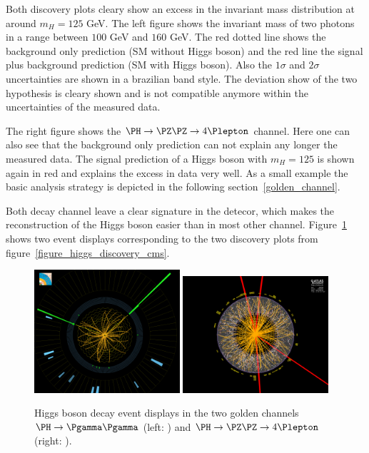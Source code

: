 Both discovery plots cleary show an excess in the invariant mass distribution at around $m_H=125$ GeV. The left figure
shows the invariant mass of two photons in a range between $100$ GeV and $160$ GeV. The red dotted line shows the background only
prediction (SM without Higgs boson) and the red line the signal plus background prediction (SM with Higgs boson). Also the $1\sigma$ and $2\sigma$
uncertainties are shown in a brazilian band style. The deviation show of the two hypothesis is cleary shown and is not compatible anymore within
the uncertainties of the measured data.

The right figure shows the $\PH \rightarrow \PZ \PZ \rightarrow 4\Plepton$ channel. Here one can also see that the background only prediction can not
explain any longer the measured data. The signal prediction of a Higgs boson with $m_H=125$ is shown again in red and explains the excess in data very well.
As a small example the basic analysis strategy is depicted in the following section~\ref{golden_channel}.

Both decay channel leave a clear signature in the detecor, which makes the reconstruction of the Higgs boson easier than in most other
channel. Figure~\ref{figure_higgs_discovery_eventdisplay} shows two event displays corresponding to the two discovery plots from figure~\ref{figure_higgs_discovery_cms}.

\begin{figure}[h]
\includegraphics[width=0.48\textwidth]{../plots/cms_event_display.png}
\hfill
\includegraphics[width=0.48\textwidth]{../plots/atlas_event_display.png}
\caption[Higgs boson discovery CMS.]{Higgs boson decay event displays in the two golden channels $\PH \rightarrow \Pgamma \Pgamma$ (left: \CMS) and $\PH \rightarrow \PZ \PZ \rightarrow 4\Plepton$ (right: \ATLAS).}
\label{figure_higgs_discovery_eventdisplay}
\end{figure}

